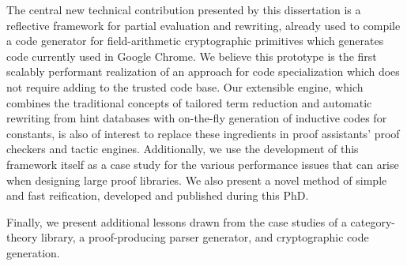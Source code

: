 The central new technical contribution presented by this dissertation is a reflective framework for partial evaluation and rewriting, already used to compile a code generator for field-arithmetic cryptographic primitives which generates code currently used in Google Chrome.
We believe this prototype is the first scalably performant realization of an approach for code specialization which does not require adding to the trusted code base.
Our extensible engine, which combines the traditional concepts of tailored term reduction and automatic rewriting from hint databases with on-the-fly generation of inductive codes for constants, is also of interest to replace these ingredients in proof assistants' proof checkers and tactic engines.
Additionally, we use the development of this framework itself as a case study for the various performance issues that can arise when designing large proof libraries.
%
We also present a novel method of simple and fast reification, developed and published during this PhD.

Finally, we present additional lessons drawn from the case studies of a category-theory library, a proof-producing parser generator, and cryptographic code generation.
